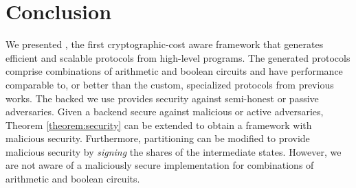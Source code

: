 \section{Conclusion}
\label{sec:conclude}
We presented \tool, the first
cryptographic-cost aware framework that generates efficient and
scalable \mpc protocols from high-level programs.
The generated protocols comprise combinations
of arithmetic and boolean circuits and have performance comparable to, or better than the custom, specialized
protocols from previous works.
The \mpc backed we use provides security against semi-honest or passive adversaries.
Given a \mpc backend secure against malicious or active adversaries, Theorem \ref{theorem:security} 
can be extended to obtain a framework with malicious security. Furthermore,  
partitioning can be modified to provide malicious security by {\it signing} the shares of the intermediate states. However, we are not aware of a maliciously secure \mpc implementation for combinations of
arithmetic and boolean circuits.
\\
\\
\\
\\
\\
\\
\\
